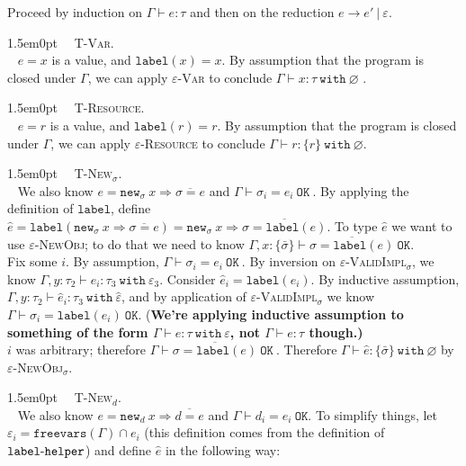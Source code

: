 \documentclass{llncs}
\newcommand{\keywadj}[1]{\mathtt{#1}}
\newcommand{\keyw}[1]{\keywadj{#1}~}
\newcommand{\kw}[1]{\keyw{ #1 }}
\newcommand{\kwa}[1]{\keywadj{ #1 }}
\newcommand{\hyphen}{\hbox{-}}
\newcommand{\proofcase}[2]{
	\begin{adjustwidth}{1.5em}{0pt}
		\fbox{Case.}~~#1. \\ ~#2
	\end{adjustwidth}
}
\newcommand{\type}[2]{
	#1~\keyw{with} #2
}
\newcommand{\newd}[0]{
	\keywadj{new}_d~x \Rightarrow \overline{d = e}
}
\newcommand{\newsig}[0]{
	\keywadj{new}_\sigma~x \Rightarrow \overline{\sigma = e}
}
\begin{document}
{Proceed by induction on $\Gamma \vdash e : \tau$ and then on the reduction $e \longrightarrow e'~|~\varepsilon$.\\

\proofcase{\textsc{T-Var}}{
$e = x$ is a value, and $\kwa{label}(x) = x$. By assumption that the program is closed under $\Gamma$, we can apply \textsc{$\varepsilon$-Var} to conclude $\Gamma \vdash x : \type{\tau}{\varnothing}$ .\\
}

\proofcase{\textsc{T-Resource}}{
$e = r$ is a value, and $\kwa{label}(r) = r$. By assumption that the program is closed under $\Gamma$, we can apply \textsc{$\varepsilon$-Resource} to conclude $\Gamma \vdash r : \type{\{ r \}}{\varnothing}$.\\
}


\proofcase{\textsc{T-New$_\sigma$}}{
We also know $e = \newsig$ and $\Gamma \vdash \sigma_i = e_i~\kw{OK}$. By applying the definition of $\kwa{label}$, define $\hat e = \kwa{label}(\newsig) = \kwa{new}_\sigma~x \Rightarrow \overline{\sigma = \kwa{label}(e)}$. To type $\hat e$ we want to use \textsc{$\varepsilon$-NewObj}; to do that we need to know $\Gamma, x : \{ \bar \sigma \} \vdash \overline{ \sigma = \kwa{label}(e) }~\kwa{OK}$.\\

\noindent
Fix some $i$. By assumption, $\Gamma \vdash \sigma_i = e_i~\kw{OK}$. By inversion on \textsc{$\varepsilon$-ValidImpl$_\sigma$}, we know $\Gamma, y : \tau_2 \vdash e_i : \type{\tau_3}{\varepsilon_3}$. Consider $\hat e_i = \kwa{label}(e_i)$. By inductive assumption, $\Gamma, y : \tau_2 \vdash \hat e_i : \type{\tau_3}{\hat \varepsilon}$, and by application of \textsc{$\varepsilon$-ValidImpl$_\sigma$} we know $\Gamma \vdash \sigma_i = \kwa{label}(e_i)~\kwa{OK}$. (\textbf{We're applying inductive assumption to something of the form $\Gamma \vdash e : \type{\tau}{\varepsilon}$, not $\Gamma \vdash e : \tau$ though.)}\\

\noindent
$i$ was arbitrary; therefore $\Gamma \vdash \overline{\sigma = \kwa{label}(e)}~\kw{OK}$. Therefore $\Gamma \vdash \hat e : \{ \bar \sigma \}~\kw{with} \varnothing$ by \textsc{$\varepsilon$-NewObj$_\sigma$}.\\
}


\proofcase{\textsc{T-New$_d$}}{
We also know $e = \newd$ and $\Gamma \vdash d_i = e_i~\kwa{OK}$. To simplify things, let $\varepsilon_i = \kwa{freevars}(\Gamma) \cap e_i$ (this definition comes from the definition of $\kwa{label \hyphen helper}$) and define $\hat e$ in the following way:

}}
\end{document}
